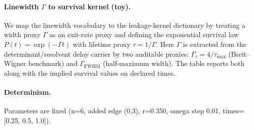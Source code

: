 \paragraph{Linewidth $\Gamma$ to survival kernel (toy).} \AuditTag We map the linewidth vocabulary to the leakage-kernel dictionary by treating a width proxy $\Gamma$ as an exit-rate proxy and defining the exponential survival law $P(t)=\exp(-\Gamma t)$ with lifetime proxy $\tau=1/\Gamma$. Here $\Gamma$ is extracted from the determinant/resolvent delay carrier by two auditable proxies: $\Gamma_\tau=4/\tau_{\max}$ (Breit--Wigner benchmark) and $\Gamma_{\mathrm{FWHM}}$ (half-maximum width). The table reports both along with the implied survival values on declared times.
\paragraph{Determinism.} \AuditTag Parameters are fixed (n=6, added edge (0,3), r=0.350, omega step 0.01, times=[0.25, 0.5, 1.0]).